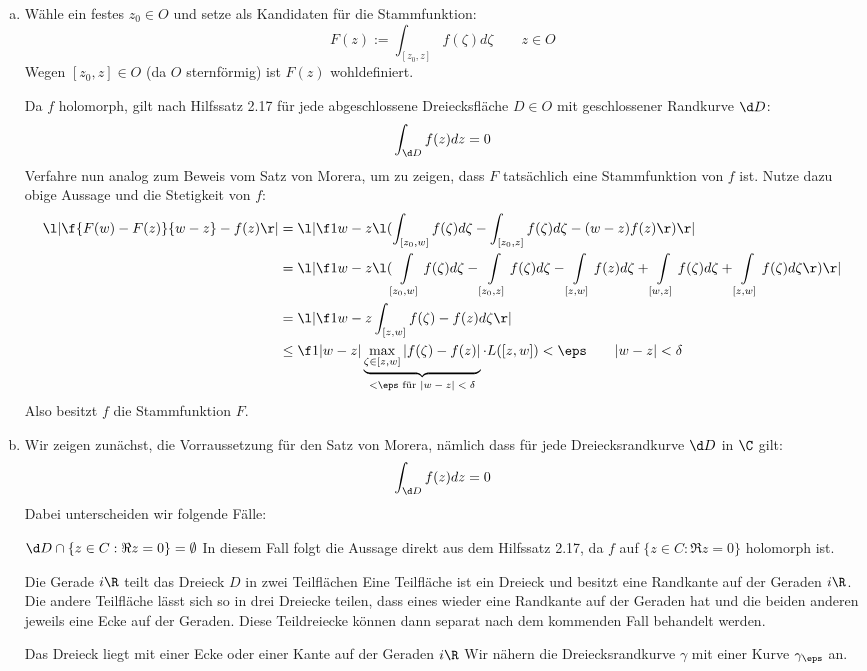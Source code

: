 \documentclass{mywork}
\begin{document}
	\setcounter{section}{4}
	\begin{aufgabe}
		\begin{enumerate}[a)]
			\item
				Wähle ein festes $z_0\in O$ und setze als Kandidaten für die Stammfunktion:
				\[
					F(z) := \int_{[z_0,z]} f(\zeta) d\zeta \qquad z\in O
				\]
				Wegen $[z_0,z]\in O$ (da $O$ sternförmig) ist $F(z)$ wohldefiniert.

				Da $f$ holomorph, gilt nach Hilfssatz 2.17 für jede abgeschlossene Dreiecksfläche $D\in O$ mit geschlossener Randkurve $\d D$:
				\[
					\int_{\d D} f(z) dz = 0
				\]
				Verfahre nun analog zum Beweis vom Satz von Morera, um zu zeigen, dass $F$ tatsächlich eine Stammfunktion von $f$ ist.
				Nutze dazu obige Aussage und die Stetigkeit von $f$:
				\begin{align*}
					\l| \f {F(w)-F(z)}{w-z} - f(z) \r|
					&= \l| \f 1{w-z} \l( \int_{[z_0,w]}f(\zeta) d\zeta - \int_{[z_0,z]}f(\zeta)d\zeta - (w-z) f(z) \r) \r| \\
					&= \l| \f 1{w-z} \l( \int\limits_{[z_0,w]}f(\zeta) d\zeta - \int\limits_{[z_0,z]}f(\zeta)d\zeta - \int\limits_{[z,w]}f(z) d\zeta + \int\limits_{[w,z]}f(\zeta) d\zeta + \int\limits_{[z,w]} f(\zeta) d\zeta \r)\r| \\
					&= \l| \f 1{w-z} \int_{[z,w]} f(\zeta) - f(z) d\zeta \r| \\
					&\le \f 1{|w-z|} \underbrace{\max_{\zeta\in [z,w]} |f(\zeta) - f(z)|}_{< \eps \text{ für $|w-z|<\delta$}} \cdot L([z,w])
					< \eps \qquad |w-z| < \delta
				\end{align*}
				Also besitzt $f$ die Stammfunktion $F$.
			\item
				Wir zeigen zunächst, die Vorraussetzung für den Satz von Morera, nämlich dass für jede Dreiecksrandkurve $\d D$ in $\C$ gilt:
				\[
					\int_{\d D} f(z) dz = 0
				\]
				Dabei unterscheiden wir folgende Fälle:

				\begin{seg}{$\d D \cap \{z\in C : \Re z = 0\} = \emptyset$}
					In diesem Fall folgt die Aussage direkt aus dem Hilfssatz 2.17, da $f$ auf $\{z\in C : \Re z = 0\}$ holomorph ist.										
				\end{seg}
				\begin{seg}{Die Gerade $i\R$ teilt das Dreieck $D$ in zwei Teilflächen}
					Eine Teilfläche ist ein Dreieck und besitzt eine Randkante auf der Geraden $i\R$.
					Die andere Teilfläche lässt sich so in drei Dreiecke teilen, dass eines wieder eine Randkante auf der Geraden hat und die beiden anderen jeweils eine Ecke auf der Geraden.
					Diese Teildreiecke können dann separat nach dem kommenden Fall behandelt werden.
				\end{seg}
				\begin{seg}{Das Dreieck liegt mit einer Ecke oder einer Kante auf der Geraden $i\R$}
					Wir nähern die Dreiecksrandkurve $\gamma$ mit einer Kurve $\gamma_\eps$ an.


\end{seg}
\end{enumerate}
\end{aufgabe}
\end{document}
